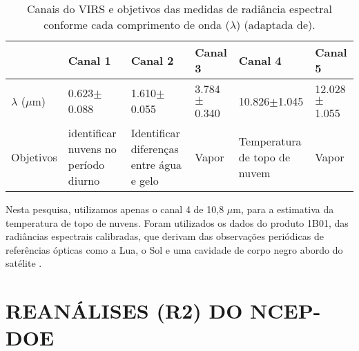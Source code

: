 \begin{table}[!ht]
\caption{Canais do VIRS e objetivos das medidas de radiância espectral conforme cada comprimento de onda ($\lambda$) (adaptada de).}
\label{canaisVirs}
\centering
\small
\newcommand{\grayline}{\rowcolor[gray]{.88}}
\renewcommand {\tabularxcolumn }[1]{ >{\arraybackslash }m{#1}}
\begin{tabularx}{\textwidth}{W W W W W W} %
\hline\hline 
  & Canal 1 & Canal 2 & Canal 3 & Canal 4 & Canal 5\\[1.5pt]
\hline
\grayline $\lambda$ ($\mu$m) & 0.623$\pm$0.088 & 1.610$\pm$0.055 & 3.784$\pm$0.340 & 10.826$\pm$1.045 & 12.028$\pm$1.055 \\[1.5pt]
Objetivos & identificar nuvens no período diurno & Identificar diferenças entre água e gelo & Vapor & Temperatura de topo de nuvem& Vapor \\[1.5pt]

\hline 
\end{tabularx}
\end{table}


Nesta pesquisa, utilizamos apenas o canal 4 de 10,8 $\mu$m, para a estimativa da temperatura de topo de nuvens. Foram utilizados os dados do produto 1B01, das radiâncias espectrais calibradas, que derivam das observações periódicas de referências ópticas como a Lua, o Sol e uma cavidade de corpo negro abordo do satélite \cite{kummerok1998}.






\section{REANÁLISES (R2) DO NCEP-DOE}

